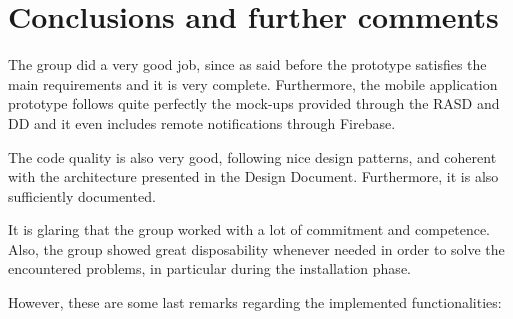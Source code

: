 \documentclass[a4paper,oneside,11pt]{book}
\begin{document}
\chapter{Conclusions and further comments}
    The group did a very good job, since as said before the prototype satisfies the main requirements and it is very complete. Furthermore, the mobile application prototype follows quite perfectly the mock-ups provided through the RASD and DD and it even includes remote notifications through Firebase. \par
    The code quality is also very good, following nice design patterns, and coherent with the architecture presented in the Design Document. Furthermore, it is also sufficiently documented. \par
    It is glaring that the group worked with a lot of commitment and competence.
    Also, the group showed great disposability whenever needed in order to solve the encountered problems, in particular during the installation phase. \par
    However, these are some last remarks regarding the implemented functionalities:
\end{document}
